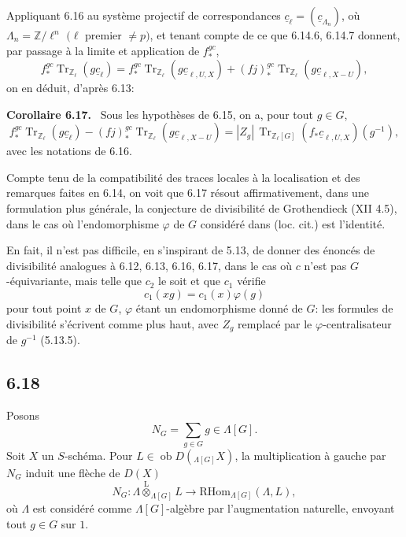\documentclass[11pt]{article}
\newenvironment{statement}[1]{\par\medskip\noindent\textbf{#1.}\ }{\par\medskip}
\providecommand{\RHom}{\mathrm{RHom}}
\providecommand{\Tr}{\operatorname{Tr}}
\providecommand{\Tr}{\operatorname{Tr}}
\providecommand{\lten}{\overset{\mathrm L}{\otimes}}
\providecommand{\Ob}{\operatorname{ob}}
\providecommand{\Tr}{\operatorname{Tr}}
\providecommand{\RHom}{\mathrm{RHom}}
\providecommand{\lten}{\overset{\mathrm L}{\otimes}}
\providecommand{\RHom}{\mathrm R\mathcal{H}om}
\providecommand{\lten}{\overset{\mathrm L}{\otimes}}
\providecommand{\Ob}{\operatorname{ob}}
\providecommand{\Tr}{\operatorname{Tr}}
\providecommand{\lten}{\overset{\mathrm L}{\otimes}}
\providecommand{\lten}{\overset{\mathrm L}{\otimes}}
\providecommand{\Ob}{\operatorname{Ob}}
\providecommand{\lten}{\overset{\mathrm L}{\otimes}}
\begin{document}
Appliquant 6.16 au système projectif de correspondances $\underline c_{\ell}=(\underline c_{\Lambda_n})$, où $\Lambda_n=\mathbb Z/\ell^n$ $(\ell$ premier $\ne p)$, et tenant compte de ce que 6.14.6, 6.14.7 donnent, par passage à la limite et application de $f_*^{gc}$,
\[
f_*^{gc}\Tr_{\mathbb Z_{\ell}}(g\underline c_{\ell})
=
f_*^{gc}\Tr_{\mathbb Z_{\ell}}(g\underline c_{\ell,U,X})
+(fj)_*^{gc}\Tr_{\mathbb Z_{\ell}}(g\underline c_{\ell,X-U}),
\]
on en déduit, d'après 6.13:

\begin{statement}{Corollaire 6.17}
Sous les hypothèses de 6.15, on a, pour tout $g\in G$,
\begin{equation}
f_*^{gc}\Tr_{\mathbb Z_{\ell}}(g\underline c_{\ell})
-(fj)_*^{gc}\Tr_{\mathbb Z_{\ell}}(g\underline c_{\ell,X-U})
=
|Z_g|\,\Tr_{\mathbb Z_{\ell}[G]}(f_*\underline c_{\ell,U,X})(g^{-1}),
\tag{6.17.1}
\end{equation}
avec les notations de 6.16.
\end{statement}

Compte tenu de la compatibilité des traces locales à la localisation et des remarques faites en 6.14, on voit que 6.17 résout affirmativement, dans une formulation plus générale, la conjecture de divisibilité de Grothendieck (XII 4.5), dans le cas où l'endomorphisme $\varphi$ de $G$ considéré dans (loc. cit.) est l'identité.

En fait, il n'est pas difficile, en s'inspirant de 5.13, de donner des énoncés de divisibilité analogues à 6.12, 6.13, 6.16, 6.17, dans le cas où $c$ n'est pas $G$-équivariante, mais telle que $c_2$ le soit et que $c_1$ vérifie
\[
c_1(xg)=c_1(x)\varphi(g)
\]
pour tout point $x$ de $G$, $\varphi$ étant un endomorphisme donné de $G$: les formules de divisibilité s'écrivent comme plus haut, avec $Z_g$ remplacé par le $\varphi$-centralisateur de $g^{-1}$ (5.13.5).

\subsection*{6.18}
Posons
\begin{equation}
N_G=\sum_{g\in G} g\in\Lambda[G].
\tag{6.18.1}
\end{equation}
Soit $X$ un $S$-schéma. Pour $L\in\Ob D({}_{\Lambda[G]}X)$, la multiplication à gauche par $N_G$ induit une flèche de $D(X)$
\begin{equation}
N_G:\Lambda\lten_{\Lambda[G]}L
\longrightarrow
\RHom_{\Lambda[G]}(\Lambda,L),
\tag{6.18.2}
\end{equation}
où $\Lambda$ est considéré comme $\Lambda[G]$-algèbre par l'augmentation naturelle, envoyant tout $g\in G$ sur $1$.
\end{document}
